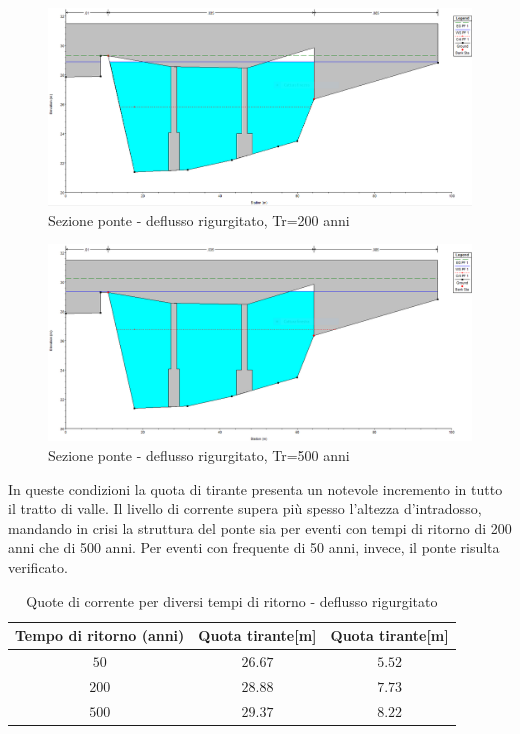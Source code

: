 \documentclass[12pt]{article} %
\begin{document}
\begin{figure}[H]
    \centering
    \includegraphics[scale=0.5]{PonteUP8.PNG}
    \caption{Sezione ponte - deflusso rigurgitato, Tr=200 anni}
\end{figure}

\begin{figure}[H]
    \centering
    \includegraphics[scale=0.5]{PonteUP82.PNG}
    \caption{Sezione ponte - deflusso rigurgitato, Tr=500 anni}
\end{figure}

\noindent In queste condizioni la quota di tirante presenta un notevole incremento in tutto il tratto di valle. Il livello di corrente supera più spesso l'altezza d'intradosso, mandando in crisi la struttura del ponte sia per eventi con tempi di ritorno di 200 anni che di 500 anni. Per eventi con frequente di 50 anni, invece, il ponte risulta verificato.

\begin{table}[H]
    \centering
    \begin{tabular}{|c|c|c|}
        \hline
        \textbf{Tempo di ritorno (anni)} &\textbf{Quota tirante[m]}& \textbf{Quota tirante[m]} \\
        \hline
        $50$ & $26.67$ & $5.52$\\
        $200$ & $28.88$ & $7.73$\\
        $500$ & $29.37$ & $8.22$\\
        \hline
    \end{tabular}
    \caption{Quote di corrente per diversi tempi di ritorno - deflusso rigurgitato}
\end{table}
\end{document}

